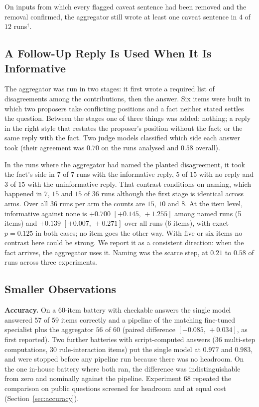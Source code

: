 \documentclass[10pt,twocolumn]{article}
\newcommand{\ci}[2]{\ensuremath{[#1,\,#2]}}
\begin{document}
On inputs from which every flagged caveat sentence had been removed and
the removal confirmed, the aggregator still wrote at least one caveat
sentence in $4$ of $12$ runs$^\dagger$.

\subsection{A Follow-Up Reply Is Used When It Is Informative}
\label{sec:followup}

The aggregator was run in two stages: it first wrote a required list of
disagreements among the contributions, then the answer. Six items were
built in which two proposers take conflicting positions and a fact
neither stated settles the question. Between the stages one of three
things was added: nothing; a reply in the right style that restates
the proposer's position without the fact; or the same reply with the
fact. Two judge models classified which side each answer took (their
agreement was $0.70$ on the runs analysed and $0.58$ overall).

In the runs where the aggregator had named the planted disagreement,
it took the fact's side in $7$ of $7$ runs with the informative reply,
$5$ of $15$ with no reply and $3$ of $15$ with the uninformative reply.
That contrast conditions on naming, which happened in $7$, $15$ and
$15$ of $36$ runs although the first stage is identical across arms.
Over all $36$ runs per arm the counts are $15$, $10$ and $8$. At the
item level, informative against none is $+0.700$ \ci{+0.145}{+1.255}
among named runs (5 items) and $+0.139$ \ci{+0.007}{+0.271} over all
runs (6 items), with exact $p=0.125$ in both cases; no item goes the
other way. With five or six items no contrast here could be strong.
We report it as a consistent direction: when the fact arrives, the
aggregator uses it. Naming was the scarce step, at $0.21$ to $0.58$ of
runs across three experiments.

\subsection{Smaller Observations}
\label{sec:smaller}

\textbf{Accuracy.} On a 60-item battery with checkable answers the
single model answered $57$ of $59$ items correctly and a pipeline of
the matching fine-tuned specialist plus the aggregator $56$ of $60$
(paired difference \ci{-0.085}{+0.034}, as first reported). Two further
batteries with script-computed answers (36
multi-step computations, 30 rule-interaction items) put the single
model at $0.977$ and $0.983$, and were stopped before any pipeline run
because there was no headroom. On the one in-house battery where
both ran, the difference was indistinguishable from zero and nominally
against the pipeline. Experiment 68 repeated the comparison on public
questions screened for headroom and at equal cost
(Section~\ref{sec:accuracy}).
\end{document}
